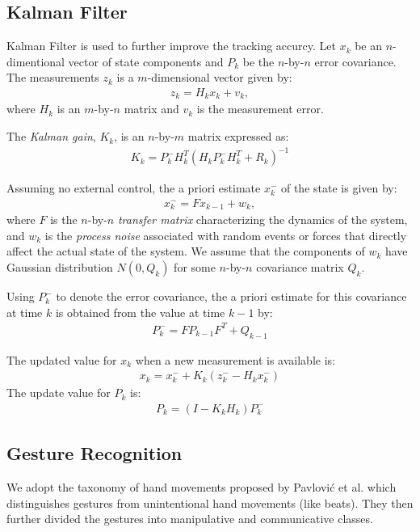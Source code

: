 \subsection{Kalman Filter}
Kalman Filter is used to further improve the tracking accurcy.
Let $x_k$ be an $n$-dimentional vector of state components and $P_k$ be the
$n$-by-$n$ error covariance. The measurements $z_k$ is a $m$-dimensional
vector given by:
\begin{align*}
z_k = H_kx_k + v_k,
\end{align*}
where $H_k$ is an $m$-by-$n$ matrix and $v_k$ is the measurement error.

The \textit{Kalman gain}, $K_k$, is an $n$-by-$m$ matrix expressed as:
\begin{align*}
K_k = P_k^-H_k^T(H_kP_k^-H_k^T + R_k)^{-1}
\end{align*}

Assuming no external control, the a priori estimate $x_k^-$ of the state is
given by:
\begin{align*}
x_k^- = Fx_{k - 1} + w_k,
\end{align*}
where $F$ is the $n$-by-$n$ \textit{transfer matrix} characterizing the
dynamics of the system, and $w_k$ is the \textit{process noise} associated with
random events or forces that directly affect the actual state of the system. We assume that the components of $w_k$
have Gaussian distribution $N(0, Q_k)$ for some $n$-by-$n$ covariance matrix
$Q_k$.

Using $P_k^-$ to denote the error covariance, the a priori estimate for this
covariance at time $k$ is obtained from the value at time $k - 1$ by:
\begin{align*}
P_k^- = FP_{k - 1}F^T + Q_{k - 1}
\end{align*}

The updated value for $x_k$ when a new measurement is available is:
\begin{align*}
x_k = x_k^- + K_k(z_k^- - H_kx_k^-)
\end{align*}
The update value for $P_k$ is:
\begin{align*}
P_k = (I - K_kH_k)P_k^-
\end{align*}
   
\subsection{Gesture Recognition}
We adopt the taxonomy of hand movements proposed by Pavlovi\'{c} et al. \cite{Pavlovic97} which distinguishes gestures from unintentional hand movements (like beats). They then further divided the gestures into manipulative and communicative classes. 

